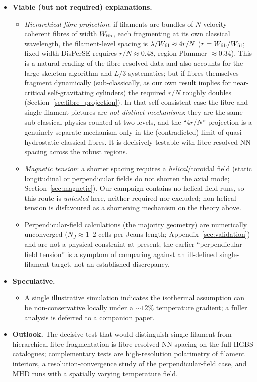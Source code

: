 \documentclass[usenatbib,twoside,twocolumn]{mnras}
\begin{document}
\begin{itemize}
    \item \textbf{Viable (but not required) explanations.}
    \begin{itemize}
        \item \emph{Hierarchical-fibre projection}: if filaments are bundles of $N$ velocity-coherent fibres of width $W_{\rm fib}$, each fragmenting at its own classical wavelength, the filament-level spacing is $\lambda/W_{\rm fil}\approx4r/N$ ($r=W_{\rm fib}/W_{\rm fil}$; fixed-width DisPerSE requires $r/N\approx0.48$, region-Plummer $\approx0.34$). This is a natural reading of the fibre-resolved data \citep{Yang2024,Hacar2013} and also accounts for the large skeleton-algorithm and $L/3$ systematics; but if fibres themselves fragment dynamically (sub-classically, as our own result implies for near-critical self-gravitating cylinders) the required $r/N$ roughly doubles (Section~\ref{sec:fibre_projection}). In that self-consistent case the fibre and single-filament pictures are \emph{not distinct mechanisms}: they are the same sub-classical physics counted at two levels, and the ``$4r/N$'' projection is a genuinely separate mechanism only in the (contradicted) limit of quasi-hydrostatic classical fibres. It is decisively testable with fibre-resolved NN spacing across the robust regions.
        \item \emph{Magnetic tension}: a shorter spacing requires a \emph{helical}/toroidal field (static longitudinal or perpendicular fields do not shorten the axial mode; Section~\ref{sec:magnetic}). Our campaign contains no helical-field runs, so this route is \emph{untested} here, neither required nor excluded; non-helical tension is disfavoured as a shortening mechanism on the theory above.
        \item Perpendicular-field calculations (the majority geometry) are numerically unconverged ($N_J\approx1$--$2$ cells per Jeans length; Appendix~\ref{sec:validation}) and are not a physical constraint at present; the earlier ``perpendicular-field tension'' is a symptom of comparing against an ill-defined single-filament target, not an established discrepancy.
    \end{itemize}

    \item \textbf{Speculative.}
    \begin{itemize}
        \item A single illustrative simulation indicates the isothermal assumption can be non-conservative locally under a $\sim12\%$ temperature gradient; a fuller analysis is deferred to a companion paper.
    \end{itemize}

    \item \textbf{Outlook.} The decisive test that would distinguish single-filament from hierarchical-fibre fragmentation is fibre-resolved NN spacing on the full HGBS catalogues; complementary tests are high-resolution polarimetry of filament interiors, a resolution-convergence study of the perpendicular-field case, and MHD runs with a spatially varying temperature field.
    \end{itemize}
\end{document}
